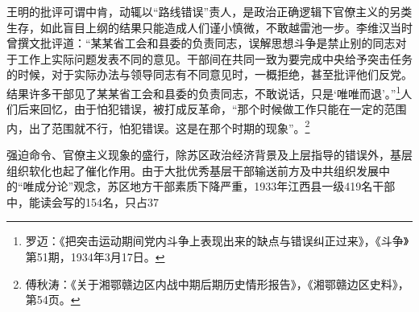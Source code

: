 王明的批评可谓中肯，动辄以“路线错误”责人，是政治正确逻辑下官僚主义的另类生存，如此盲目上纲的结果只能造成人们谨小慎微，不敢越雷池一步。李维汉当时曾撰文批评道：“某某省工会和县委的负责同志，误解思想斗争是禁止别的同志对于工作上实际问题发表不同的意见。干部间在共同一致为要完成中央给予突击任务的时候，对于实际办法与领导同志有不同意见时，一概拒绝，甚至批评他们反党。结果许多干部见了某某省工会和县委的负责同志，不敢说话，只是‘唯唯而退’。”\footnote{罗迈：《把突击运动期间党内斗争上表现出来的缺点与错误纠正过来》，《斗争》第51期，1934年3月17日。}人们后来回忆，由于怕犯错误，被打成反革命，“那个时候做工作只能在一定的范围内，出了范围就不行，怕犯错误。这是在那个时期的现象”。\footnote{傅秋涛：《关于湘鄂赣边区内战中期后期历史情形报告》，《湘鄂赣边区史料》，第54页。}


强迫命令、官僚主义现象的盛行，除苏区政治经济背景及上层指导的错误外，基层组织软化也起了催化作用。由于大批优秀基层干部输送前方及中共组织发展中的“唯成分论”观念，苏区地方干部素质下降严重，1933年江西县一级419名干部中，能读会写的154名，只占37%


